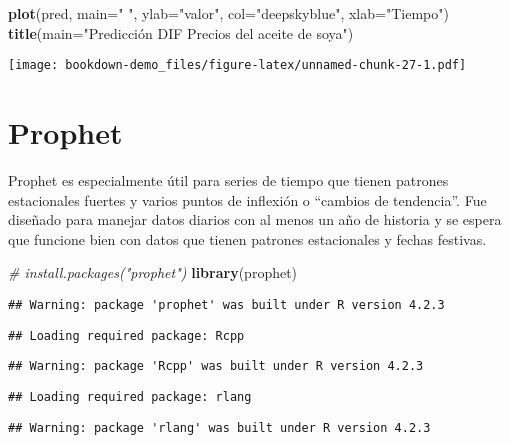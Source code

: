 \documentclass[
]{book}
\newenvironment{Shaded}{\begin{snugshade}}{\end{snugshade}}
\newcommand{\AttributeTok}[1]{\textcolor[rgb]{0.13,0.29,0.53}{#1}}
\newcommand{\CommentTok}[1]{\textcolor[rgb]{0.56,0.35,0.01}{\textit{#1}}}
\newcommand{\FunctionTok}[1]{\textcolor[rgb]{0.13,0.29,0.53}{\textbf{#1}}}
\newcommand{\NormalTok}[1]{#1}
\newcommand{\StringTok}[1]{\textcolor[rgb]{0.31,0.60,0.02}{#1}}
\begin{document}
\begin{Shaded}
\begin{Highlighting}[]
\FunctionTok{plot}\NormalTok{(pred, }\AttributeTok{main=}\StringTok{" "}\NormalTok{, }\AttributeTok{ylab=}\StringTok{"valor"}\NormalTok{, }\AttributeTok{col=}\StringTok{"deepskyblue"}\NormalTok{, }\AttributeTok{xlab=}\StringTok{"Tiempo"}\NormalTok{)}
\FunctionTok{title}\NormalTok{(}\AttributeTok{main=}\StringTok{"Predicción DIF Precios del aceite de soya"}\NormalTok{)}
\end{Highlighting}
\end{Shaded}

\texttt{[image: bookdown-demo\_files/figure-latex/unnamed-chunk-27-1.pdf]}

\hypertarget{prophet}{%
\chapter{Prophet}\label{prophet}}

Prophet es especialmente útil para series de tiempo que tienen patrones estacionales fuertes y varios puntos de inflexión o ``cambios de tendencia''. Fue diseñado para manejar datos diarios con al menos un año de historia y se espera que funcione bien con datos que tienen patrones estacionales y fechas festivas.

\begin{Shaded}
\begin{Highlighting}[]
\CommentTok{\# install.packages("prophet")}
\FunctionTok{library}\NormalTok{(prophet)}
\end{Highlighting}
\end{Shaded}

\begin{verbatim}
## Warning: package 'prophet' was built under R version 4.2.3
\end{verbatim}

\begin{verbatim}
## Loading required package: Rcpp
\end{verbatim}

\begin{verbatim}
## Warning: package 'Rcpp' was built under R version 4.2.3
\end{verbatim}

\begin{verbatim}
## Loading required package: rlang
\end{verbatim}

\begin{verbatim}
## Warning: package 'rlang' was built under R version 4.2.3
\end{verbatim}
\end{document}
